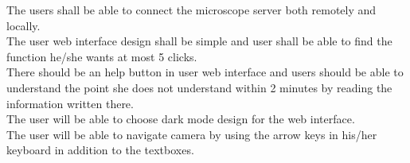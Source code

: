 \req The users shall be able to connect the microscope server both remotely and locally. \\
\req The user web interface design shall be simple and user shall be able to find the function he/she wants at most 5 clicks. \\
\req There should be an help button in user web interface and users should be able to understand the point she does not understand within 2 minutes by reading the information written there. \\
\req The user will be able to choose dark mode design for the web interface. \\
\req The user will be able to navigate camera by using the arrow keys in his/her keyboard in addition to the textboxes.